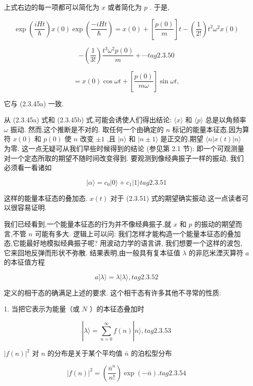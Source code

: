 \documentclass[lang=cn,newtx,10pt,scheme=chinese,thmcnt=section]{elegantbook}
\begin{document}
上式右边的每一项都可以简化为 $x$ 或者简化为 $p$ . 于是,

$$
\exp \left( \frac{iHt}{\hbar }\right) x\left( 0\right) \exp \left( \frac{-{iHt}}{\hbar }\right) = x\left( 0\right) + \left\lbrack \frac{p\left( 0\right) }{m}\right\rbrack t - \left( \frac{1}{2!}\right) {t}^{2}{\omega }^{2}x\left( 0\right)
$$

$$
- \left( \frac{1}{3!}\right) \frac{{t}^{3}{\omega }^{2}p\left( 0\right) }{m} + \cdots tag{2. 3.50}
$$

$$
= x\left( 0\right) \cos {\omega t} + \left\lbrack \frac{p\left( 0\right) }{m\omega }\right\rbrack \sin {\omega t},
$$

它与 (2.3.45a) 一致.

从 (2.3.45a) 式和 (2.3.45b) 式,可能会诱使人们得出结论: $\langle x\rangle$ 和 $\langle p\rangle$ 总是以角频率 $\omega$ 振动. 然而,这个推断是不对的. 取任何一个由确定的 $n$ 标记的能量本征态,因为算符 $x\left( 0\right)$ 和 $p\left( 0\right)$ 使 $n$ 改变 $\pm 1$ ,且 $|n\rangle$ 和 $|n \pm 1\rangle$ 是正交的,期望 $\langle n | x\left( t\right) | n\rangle$ 为零. 这一点无疑可从我们早些时候得到的结论 (参见第 2.1 节): 即一个可观测量对一个定态所取的期望不随时间改变得到. 要观测到像经典振子一样的振动, 我们必须看一看诸如

$$
|\alpha \rangle = {c}_{0}\left| {0\rangle + {c}_{1}}\right| 1\rangle tag{2. 3.51}
$$

这样的能量本征态的叠加态. $x\left( t\right)$ 对于 (2.3.51) 式的期望确实振动,这一点读者可以很容易证明.

我们已经看到,一个能量本征态的行为并不像经典振子,就 $x$ 和 $p$ 的振动的期望而言,不管 $n$ 可能有多大. 逻辑上可以问: 我们怎样才能构造一个能量本征态的叠加态,它能最好地模拟经典振子呢? 用波动力学的语言讲, 我们想要一个这样的波包, 它来回地反弹而形状不弥散. 结果表明,由一般具有复本征值 $\lambda$ 的非厄米湮灭算符 $a$ 的本征值方程

$$
a\left| {\lambda \rangle = \lambda }\right| \lambda \rangle , tag{2.3.52}
$$

定义的相干态的确满足上述的要求. 这个相干态有许多其他不寻常的性质:

1. 当把它表示为能量（或 $N$ ）的本征态叠加时

$$
\left| {\lambda \rangle = \mathop{\sum }\limits_{{n = 0}}^{\infty }f\left( n\right) }\right| n\rangle , tag{2. 3.53}
$$

${\left| f\left( n\right) \right| }^{2}$ 对 $n$ 的分布是关于某个平均值 $\bar{n}$ 的泊松型分布

$$
{\left| f\left( n\right) \right| }^{2} = \left( \frac{{\bar{n}}^{n}}{n!}\right) \exp \left( {-\bar{n}}\right) . tag{2. 3.54}
$$
\end{document}
